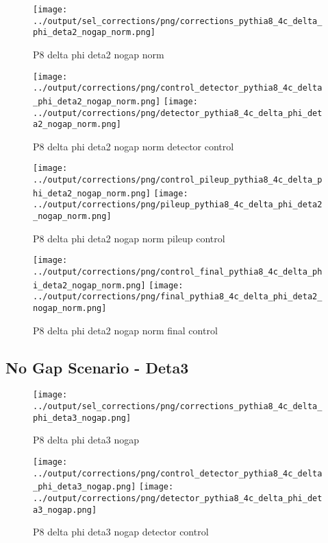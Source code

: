 \documentclass[11pt]{book}
\begin{document}
\begin{figure}[ht]
\centering
\texttt{[image: ../output/sel\_corrections/png/corrections\_pythia8\_4c\_delta\_phi\_deta2\_nogap\_norm.png]}
\caption{P8 delta phi deta2 nogap norm}
\label{fig:p8_delta_phi_deta2_nogap_norm}
\end{figure}


\begin{figure}[ht]
\centering
\texttt{[image: ../output/corrections/png/control\_detector\_pythia8\_4c\_delta\_phi\_deta2\_nogap\_norm.png]}
\texttt{[image: ../output/corrections/png/detector\_pythia8\_4c\_delta\_phi\_deta2\_nogap\_norm.png]}
\caption{P8 delta phi deta2 nogap norm detector control}
\label{fig:p8_delta_phi_deta2_nogap_norm_detector_control}
\end{figure}

\begin{figure}[ht]
\centering
\texttt{[image: ../output/corrections/png/control\_pileup\_pythia8\_4c\_delta\_phi\_deta2\_nogap\_norm.png]}
\texttt{[image: ../output/corrections/png/pileup\_pythia8\_4c\_delta\_phi\_deta2\_nogap\_norm.png]}
\caption{P8 delta phi deta2 nogap norm pileup control}
\label{fig:p8_delta_phi_deta2_nogap_norm_pileup_control}
\end{figure}


\begin{figure}[ht]
\centering
\texttt{[image: ../output/corrections/png/control\_final\_pythia8\_4c\_delta\_phi\_deta2\_nogap\_norm.png]}
\texttt{[image: ../output/corrections/png/final\_pythia8\_4c\_delta\_phi\_deta2\_nogap\_norm.png]}
\caption{P8 delta phi deta2 nogap norm final control}
\label{fig:p8_delta_phi_deta2_nogap_norm_final_control}
\end{figure}



\clearpage
\subsection{No Gap Scenario - Deta3}
\begin{figure}[ht]
\centering
\texttt{[image: ../output/sel\_corrections/png/corrections\_pythia8\_4c\_delta\_phi\_deta3\_nogap.png]}
\caption{P8 delta phi deta3 nogap}
\label{fig:p8_delta_phi_deta3_nogap}
\end{figure}


\begin{figure}[ht]
\centering
\texttt{[image: ../output/corrections/png/control\_detector\_pythia8\_4c\_delta\_phi\_deta3\_nogap.png]}
\texttt{[image: ../output/corrections/png/detector\_pythia8\_4c\_delta\_phi\_deta3\_nogap.png]}
\caption{P8 delta phi deta3 nogap detector control}
\label{fig:p8_delta_phi_deta3_nogap_detector_control}
\end{figure}
\end{document}
